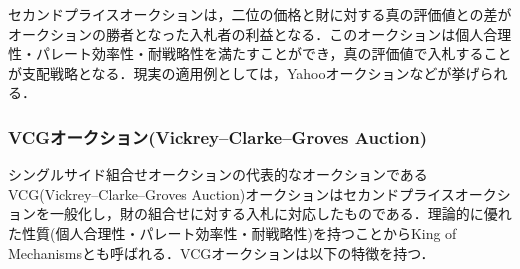 セカンドプライスオークションは，二位の価格と財に対する真の評価値との差がオークションの勝者となった入札者の利益となる．このオークションは個人合理性・パレート効率性・耐戦略性を満たすことができ，真の評価値で入札することが支配戦略となる．現実の適用例としては，Yahooオークションなどが挙げられる\cite{yahoo}．

\hypertarget{vcgux30aaux30fcux30afux30b7ux30e7ux30f3vickreyclarkegroves-auction}{%
\subsubsection{\texorpdfstring{VCGオークション(Vickrey--Clarke--Groves
Auction)
\label{VCG}}{VCGオークション(Vickrey--Clarke--Groves Auction) }}\label{vcgux30aaux30fcux30afux30b7ux30e7ux30f3vickreyclarkegroves-auction}}

シングルサイド組合せオークションの代表的なオークションであるVCG(Vickrey--Clarke--Groves
Auction)オークション\cite{vickrey}はセカンドプライスオークションを一般化し，財の組合せに対する入札に対応したものである．理論的に優れた性質(個人合理性・パレート効率性・耐戦略性)を持つことからKing
of Mechanismsとも呼ばれる．VCGオークションは以下の特徴を持つ．

